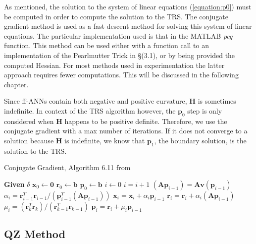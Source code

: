\documentclass[letterpaper,12pt,titlepage,oneside,final]{book}
\begin{document}
	As mentioned, the solution to the system of linear equations (\ref{equation:p0}) must be computed in order to compute the solution to the TRS. The conjugate gradient method is used as a fast descent method for solving this system of linear equations. The particular implementation used is that in the MATLAB \textit{pcg} function. This method can be used either with a function call to an implementation of the Pearlmutter Trick in \S(3.1), or by being provided the computed Hessian. For most methods used in experimentation the latter approach requires fewer computations. This will be discussed in the following chapter.
	
	 Since ff-ANNs contain both negative and positive curvature, \textbf{H} is sometimes indefinite. In context of the TRS algorithm however, the $\mathbf{p}_{0}$ step is only considered when \textbf{H} happens to be positive definite. Therefore, we use the conjugate gradient with a max number of iterations. If it does not converge to a solution because $\mathbf{H}$ is indefinite, we know that $\mathbf{p}_{1}$, the boundary solution, is the solution to the TRS.  
	 
	 \begin{algorithm}
	 	\caption{Conjugate Gradient, Algorithm 6.11 from \cite{demmel.book}}\label{algorithm:cg}
	 	\begin{algorithmic}[1]
	 		\State \textbf{Given} $\delta$ 
	 		\State $\mathbf{x}_{0} \gets \mathbf{0}$
	 		\State $\mathbf{r}_{0} \gets \mathbf{b}$
	 		\State $\mathbf{p}_{0} \gets \mathbf{b}$ 
	 		\State $i \gets 0$
	 		\State $i = i + 1$
	 		\State $(\mathbf{A}\mathbf{p}_{i-1}) = \mathbf{Av}(\mathbf{p}_{i-1})$
	 		\State $\alpha_{i} = \mathbf{r}^{T}_{i-1}\mathbf{r}_{i-1}/(\mathbf{p}^{T}_{i-1}(\mathbf{A}\mathbf{p}_{i-1}))$
	 		\State $\mathbf{x}_{i} = \mathbf{x}_{i} + \alpha_{i}\mathbf{p}_{i-1}$
	 		\State $\mathbf{r}_{i} = \mathbf{r}_{i} + \alpha_{i}(\mathbf{A}\mathbf{p}_{i-1})$ 
	 		\State $\mu_{i} = (\mathbf{r}^{T}_{k}\mathbf{r}_{k})/(\mathbf{r}_{k-1}^{T}\mathbf{r}_{k-1})$ 
	 		\State $\mathbf{p}_{i} = \mathbf{r}_{i} + \mu_{i}\mathbf{p}_{i-1}$
	 		\EndWhile 
	 		\EndProcedure
	 		\label{algorithm:cg}
	 	\end{algorithmic}
	 \end{algorithm}
		
	\subsection{QZ Method}
	
\end{document}
